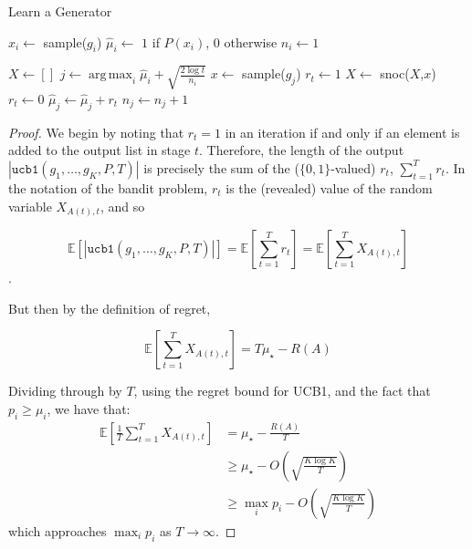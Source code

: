 \documentclass[sigconf,nonacm,review,anonymous]{acmart}
\DeclareMathOperator*{\argmax}{arg\,max}
\begin{document}
\begin{algorithm}
    \caption{Learn a Generator}
    \label{alg:ucb1}
    \begin{algorithmic}
      \State $x_i \gets $ sample($g_i$)
      \State $\hat{\mu}_i \gets$ $1$ if $P(x_i)$, $0$ otherwise
      \State $n_i \gets 1$

      \EndFor
      \State $X \gets []$
        \State $j \gets \argmax_i \hat{\mu}_i + \sqrt{\frac{2\log t}{n_i}}$
        \State $x \gets$ sample($g_j$)
          \State $r_t \gets 1$
          \State $X \gets$ snoc($X$,$x$)
        \Else
          \State $r_t \gets 0$
        \EndIf
        \State $\hat{\mu}_j \gets \hat{\mu}_j + r_t$
        \State $n_j \gets n_j + 1$
      \EndFor
      \EndFunction
    \end{algorithmic}
\end{algorithm}



\regretthm*
\begin{proof}
We begin by noting that $r_t = 1$ in an iteration if and only if an element is added to the output list in stage $t$. Therefore, the length of the output $\left|\texttt{ucb1}(g_1,\dots,g_K,P,T)\right|$ is precisely the sum of the ($\{0,1\}$-valued) $r_t$, $\sum_{t=1}^T r_t$. In the notation of the bandit problem, $r_t$ is the (revealed) value of the random variable $X_{A(t),t}$, and so 

$$\mathbb{E}\left[\left|\texttt{ucb1}(g_1,\dots,g_K,P,T)\right|\right] = \mathbb{E}\left[\sum_{t=1}^T r_t\right] = \mathbb{E}\left[\sum_{t=1}^T X_{A(t),t}\right]$$.

But then by the definition of regret,

$$
\mathbb{E}\left[\sum_{t=1}^T X_{A(t),t}\right] = T\mu_{\star} - R(A)
$$

Dividing through by $T$, using the regret bound for UCB1, and the fact that $p_i \geq \mu_i$, we have that:
\begin{align*}
\mathbb{E}\left[\frac{1}{T}\sum_{t=1}^T X_{A(t),t}\right] &= \mu_\star - \frac{R(A)}{T}\\
&\geq \mu_{\star} - O\left(\sqrt{\frac{K\log K}{T}}\right)\\
&\geq \max_i p_i - O\left(\sqrt{\frac{K\log K}{T}}\right)
\end{align*}
which approaches $\max_i p_i$ as $T \to \infty$.
\end{proof}
\end{document}
